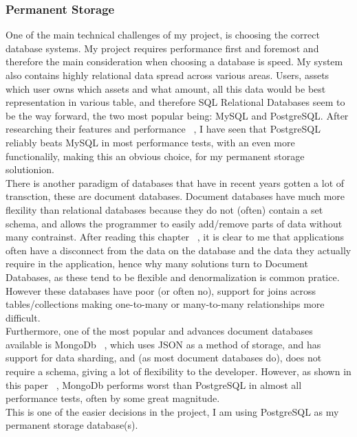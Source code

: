 \documentclass[titlepage]{article}
\begin{document}
\subsubsection{Permanent Storage}
One of the main technical challenges of my project, is choosing the correct database systems. My project requires performance first and foremost and therefore the main consideration when choosing a database is speed. My system also contains highly relational data spread across various areas. Users, assets which user owns which assets and what amount, all this data would be best representation in various table, and therefore SQL Relational Databases seem to be the way forward, the two most popular being: MySQL and PostgreSQL. After researching their features and performance ~\cite{postgres_vs_mysql}, I have seen that PostgreSQL reliably beats MySQL in most performance tests, with an even more functionalily, making this an obvious choice, for my permanent storage solutionion. \\

There is another paradigm of databases that have in recent years gotten a lot of transction, these are document databases. Document databases have much more flexility than relational databases because they do not (often) contain a set schema, and allows the programmer to easily add/remove parts of data without many contrainst. After reading this chapter ~\cite{relational_vs_document}, it is clear to me that applications often have a disconnect from the data on the database and the data they actually require in the application, hence why many solutions turn to Document Databases, as these tend to be flexible and denormalization is common pratice. However these databases have poor (or often no), support for joins across tables/collections making one-to-many or many-to-many relationships more difficult. \\

Furthermore, one of the most popular and advances document databases available is MongoDb ~\cite{mongodb}, which uses JSON as a method of storage, and has support for data sharding, and (as most document databases do), does not require a schema, giving a lot of flexibility to the developer. However, as shown in this paper ~\cite{mongo_vs_postgres}, MongoDb performs worst than PostgreSQL in almost all performance tests, often by some great magnitude. \\

This is one of the easier decisions in the project, I am using PostgreSQL as my permanent storage database(s).
\end{document}
